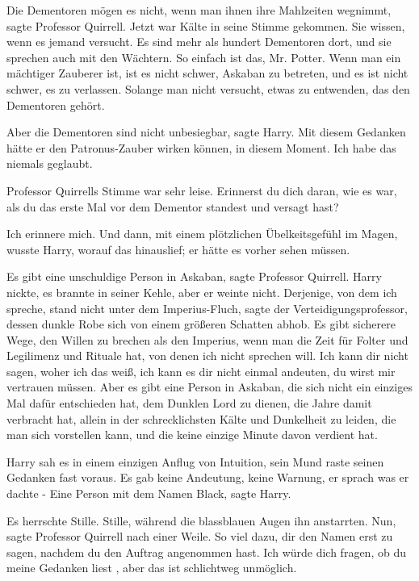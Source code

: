 \glqq{}Die Dementoren mögen es nicht, wenn man ihnen ihre Mahlzeiten
wegnimmt\grqq{}, sagte Professor Quirrell. Jetzt war Kälte in seine Stimme
gekommen. \glqq{}Sie wissen, wenn es jemand versucht. Es sind mehr als hundert
Dementoren dort, und sie sprechen auch mit den Wächtern. So einfach ist das, Mr.
Potter. Wenn man ein mächtiger Zauberer ist, ist es nicht schwer, Askaban zu
betreten, und es ist nicht schwer, es zu verlassen. Solange man nicht versucht,
etwas zu entwenden, das den Dementoren gehört.\grqq{}

\glqq{}Aber die Dementoren sind nicht unbesiegbar\grqq{}, sagte Harry. Mit diesem
Gedanken hätte er den Patronus-Zauber wirken können, in diesem Moment. \glqq{}Ich
habe das niemals geglaubt.\grqq{}

Professor Quirrells Stimme war sehr leise. \glqq{}Erinnerst du dich daran, wie es
war, als du das erste Mal vor dem Dementor standest und versagt hast?\grqq{}

\glqq{}Ich erinnere mich.\grqq{} Und dann, mit einem plötzlichen Übelkeitsgefühl im
Magen, wusste Harry, worauf das hinauslief; er hätte es vorher sehen müssen.

\glqq{}Es gibt eine unschuldige Person in Askaban\grqq{}, sagte Professor
Quirrell. Harry nickte, es brannte in seiner Kehle, aber er weinte nicht. \glqq{}
Derjenige, von dem ich spreche, stand nicht unter dem Imperius-Fluch\grqq{},
sagte der Verteidigungsprofessor, dessen dunkle Robe sich von einem größeren
Schatten abhob. \glqq{}Es gibt sicherere Wege, den Willen zu brechen als den
Imperius, wenn man die Zeit für Folter und Legilimenz und Rituale hat, von denen
ich nicht sprechen will. Ich kann dir nicht sagen, woher ich das weiß, ich kann
es dir nicht einmal andeuten, du wirst mir vertrauen müssen. Aber es gibt eine
Person in Askaban, die sich nicht ein einziges Mal dafür entschieden hat, dem
Dunklen Lord zu dienen, die Jahre damit verbracht hat, allein in der
schrecklichsten Kälte und Dunkelheit zu leiden, die man sich vorstellen kann,
und die keine einzige Minute davon verdient hat.\grqq{}

Harry sah es in einem einzigen Anflug von Intuition, sein Mund raste seinen
Gedanken fast voraus. Es gab keine Andeutung, keine Warnung, er sprach was er
dachte - \glqq{}Eine Person mit dem Namen Black\grqq{}, sagte Harry.

Es herrschte Stille. Stille, während die blassblauen Augen ihn anstarrten. \glqq{}
Nun\grqq{}, sagte Professor Quirrell nach einer Weile. \glqq{}So viel dazu, dir
den Namen erst zu sagen, nachdem du den Auftrag angenommen hast. Ich würde dich
fragen, ob du meine Gedanken liest , aber das ist schlichtweg unmöglich.\grqq{}

